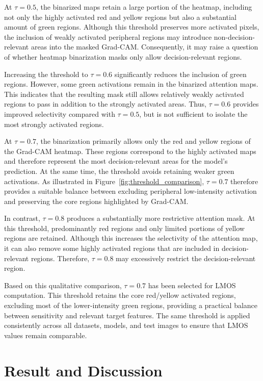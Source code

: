 \documentclass[a4paper,fleqn]{cas-dc}
\begin{document}
At $\tau=0.5$, the binarized maps retain a large portion of the heatmap, including not only the highly activated red and yellow regions but also a substantial amount of green regions. Although this threshold preserves more activated pixels, the inclusion of weakly activated peripheral regions may introduce non-decision-relevant areas into the masked Grad-CAM. Consequently, it may raise a question of whether heatmap binarization masks only allow decision-relevant regions.

Increasing the threshold to $\tau=0.6$ significantly reduces the inclusion of green regions. However, some green activations remain in the binarized attention maps. This indicates that the resulting mask still allows relatively weakly activated regions to pass in addition to the strongly activated areas. Thus, $\tau=0.6$ provides improved selectivity compared with $\tau=0.5$, but is not sufficient to isolate the most strongly activated regions.

At $\tau=0.7$, the binarization primarily allows only the red and yellow regions of the Grad-CAM heatmap. These regions correspond to the highly activated maps and therefore represent the most decision-relevant areas for the model's prediction. At the same time, the threshold avoids retaining weaker green activations. As illustrated in Figure~\ref{fig:threshold_comparison}, $\tau=0.7$ therefore provides a suitable balance between excluding peripheral low-intensity activation and preserving the core regions highlighted by Grad-CAM.

In contrast, $\tau=0.8$ produces a substantially more restrictive attention mask. At this threshold, predominantly red regions and only limited portions of yellow regions are retained. Although this increases the selectivity of the attention map, it can also remove some highly activated regions that are included in decision-relevant regions. Therefore, $\tau=0.8$ may excessively restrict the decision-relevant region.

Based on this qualitative comparison, $\tau=0.7$ has been selected for LMOS computation. This threshold retains the core red/yellow activated regions, excluding most of the lower-intensity green regions, providing a practical balance between sensitivity and relevant target features. The same threshold is applied consistently across all datasets, models, and test images to ensure that LMOS values remain comparable.



\section{Result and Discussion}
\end{document}
